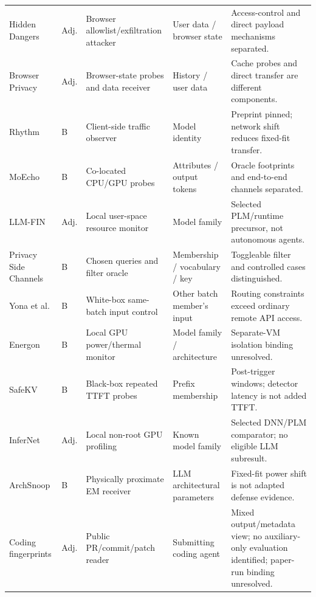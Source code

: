 \begin{table}[!t]
\begin{tabularx}{\textwidth}{@{}>{\raggedright\arraybackslash}p{}>{\raggedright\arraybackslash}p{}>{\raggedright\arraybackslash}p{}>{\raggedright\arraybackslash}p{}Y@{}}
Hidden Dangers\newline \cite{mudryi2025hidden} & Adj. & Browser allowlist/exfiltration attacker & User data / browser state & Access-control and direct payload mechanisms separated. \\
Browser Privacy\newline \cite{ukani2025browserprivacy} & Adj. & Browser-state probes and data receiver & History / user data & Cache probes and direct transfer are different components. \\
Rhythm \cite{alhazbi2025rhythm} & B & Client-side traffic observer & Model identity & Preprint pinned; network shift reduces fixed-fit transfer. \\
MoEcho \cite{ding2025moecho} & B & Co-located CPU/GPU probes & Attributes / output tokens & Oracle footprints and end-to-end channels separated. \\
LLM-FIN \cite{nazari2024llmfin} & Adj. & Local user-space resource monitor & Model family & Selected PLM/runtime precursor, not autonomous agents. \\
Privacy Side Channels\newline \cite{debenedetti2024privacy} & B & Chosen queries and filter oracle & Membership / vocabulary / key & Toggleable filter and controlled cases distinguished. \\
Yona et al. \cite{yona2024stealing} & B & White-box same-batch input control & Other batch member's input & Routing constraints exceed ordinary remote API access. \\
Energon \cite{chaudhuri2025energon} & B & Local GPU power/thermal monitor & Model family / architecture & Separate-VM isolation binding unresolved. \\
SafeKV \cite{chu2025safekv} & B & Black-box repeated TTFT probes & Prefix membership & Post-trigger windows; detector latency is not added TTFT. \\
InferNet \cite{anwar2026infernet} & Adj. & Local non-root GPU profiling & Known model family & Selected DNN/PLM comparator; no eligible LLM subresult. \\
ArchSnoop \cite{weng2026archsnoop} & B & Physically proximate EM receiver & LLM architectural parameters & Fixed-fit power shift is not adapted defense evidence. \\
Coding fingerprints\newline \cite{ghaleb2026codingfingerprint} & Adj. & Public PR/commit/patch reader & Submitting coding agent & Mixed output/metadata view; no auxiliary-only evaluation identified; paper-run binding unresolved. \\

\end{tabularx}
\end{table}
